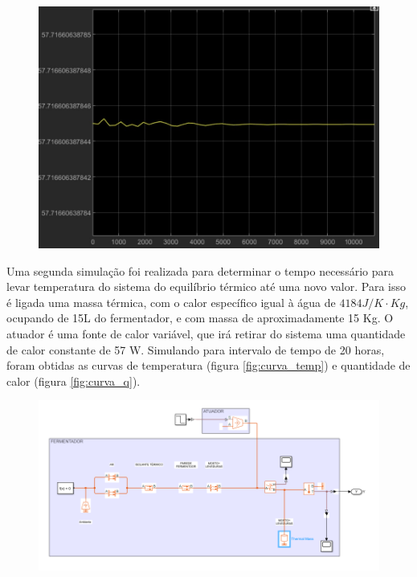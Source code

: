 \begin{figure}[h]
    \centering
    \includegraphics[scale=0.30]{figuras/projeto/controle/curva_calor.jpg}
    \label{fig:curva_calor}
\end{figure}


Uma segunda simulação foi realizada para determinar o tempo necessário para levar temperatura do sistema do  equilíbrio térmico até uma novo valor. Para isso é ligada uma massa térmica, com o calor específico igual à água de \( 4184 J/K \cdot Kg \), ocupando de 15L do fermentador, e com massa de aproximadamente 15 Kg. O atuador é uma fonte de calor variável, que irá retirar do sistema uma quantidade de calor constante de 57 W. Simulando para intervalo de tempo de 20 horas, foram obtidas as curvas de temperatura (figura \ref{fig:curva_temp}) e quantidade de calor (figura \ref{fig:curva_q}).


\begin{figure}[H]
    \centering
    \includegraphics[scale=0.50]{figuras/projeto/controle/circ_atuador.png}
    \label{fig:circ_atuador}
\end{figure}


